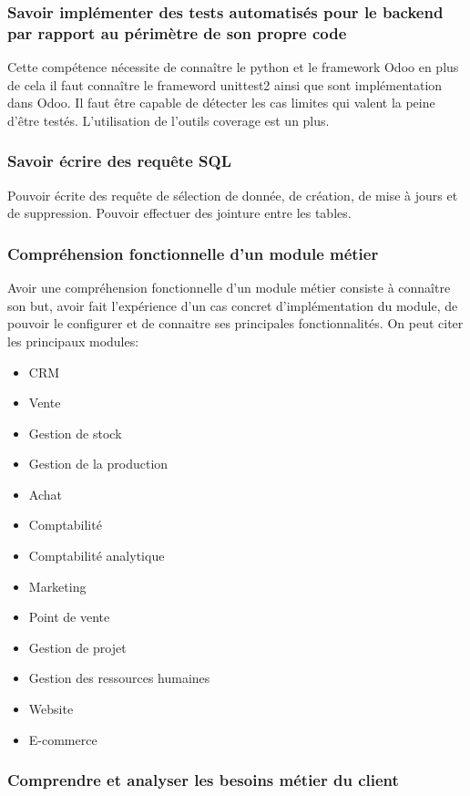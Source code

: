 \subsubsection{Savoir implémenter des tests automatisés pour le backend par rapport au périmètre de son propre code}
Cette compétence nécessite de connaître le python et le framework Odoo en plus de cela il faut connaître le frameword unittest2 ainsi que sont implémentation dans Odoo. Il faut être capable de détecter les cas limites qui valent la peine d'être testés. L'utilisation de l'outils coverage est un plus. 

\subsubsection{Savoir écrire des requête SQL}
Pouvoir écrite des requête de sélection de donnée, de création, de mise à jours et de suppression. Pouvoir effectuer des jointure entre les tables. 
\subsubsection{Compréhension fonctionnelle d'un module métier}
Avoir une compréhension fonctionnelle d'un module métier consiste à connaître son but, avoir fait l'expérience d'un cas concret d'implémentation du module, de pouvoir le configurer et de connaitre ses principales fonctionnalités. On peut citer les principaux modules:
\begin{itemize}
 \item CRM
 \item Vente
 \item Gestion de stock
 \item Gestion de la production
 \item Achat
 \item Comptabilité 
 \item Comptabilité analytique
 \item Marketing
 \item Point de vente
 \item Gestion de projet
 \item Gestion des ressources humaines
 \item Website
 \item E-commerce
\end{itemize}
\subsubsection{Comprendre et analyser les besoins métier du client}
